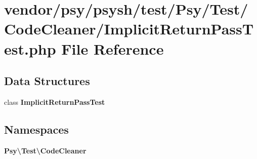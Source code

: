 \section{vendor/psy/psysh/test/\+Psy/\+Test/\+Code\+Cleaner/\+Implicit\+Return\+Pass\+Test.php File Reference}
\label{_implicit_return_pass_test_8php}
\subsection*{Data Structures}
\begin{DoxyCompactItemize}
\item 
class {\bf Implicit\+Return\+Pass\+Test}
\end{DoxyCompactItemize}
\subsection*{Namespaces}
\begin{DoxyCompactItemize}
\item 
 {\bf Psy\textbackslash{}\+Test\textbackslash{}\+Code\+Cleaner}
\end{DoxyCompactItemize}
